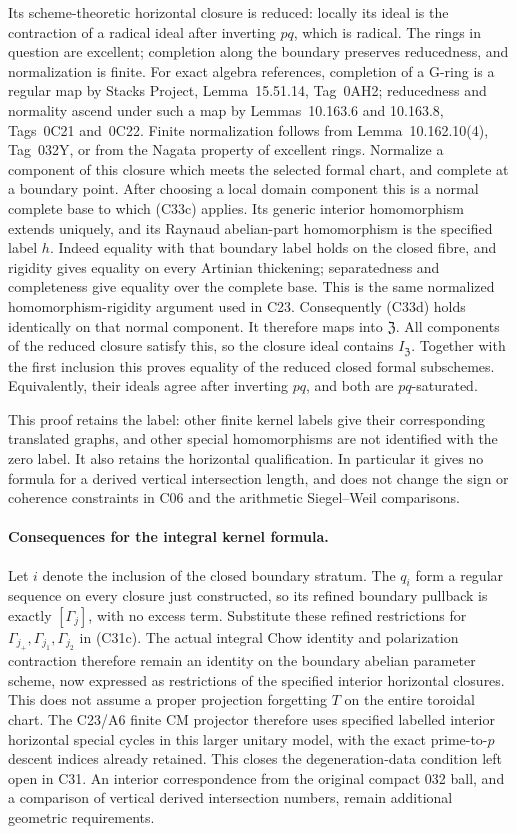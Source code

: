Its scheme-theoretic horizontal closure
is reduced: locally its ideal is the
contraction of a radical ideal after
inverting $pq$, which is radical.
The rings in question are excellent;
completion along the boundary preserves
reducedness, and normalization is finite.
For exact algebra references, completion
of a G-ring is a regular map by Stacks
Project, Lemma~15.51.14, Tag~0AH2;
reducedness and normality ascend under
such a map by Lemmas~10.163.6 and
10.163.8, Tags~0C21 and~0C22.
Finite normalization follows from
Lemma~10.162.10(4), Tag~032Y, or from
the Nagata property of excellent rings.
Normalize a component of this closure
which meets the selected formal chart,
and complete at a boundary point. After
choosing a local domain component this
is a normal complete base to which
(C33c) applies. Its generic interior
homomorphism extends uniquely, and its
Raynaud abelian-part homomorphism is the
specified label $h$. Indeed equality
with that boundary label holds on the
closed fibre, and rigidity gives equality
on every Artinian thickening; separatedness
and completeness give equality over the
complete base. This is the same
normalized homomorphism-rigidity argument
used in C23. Consequently (C33d)
holds identically on that normal component.
It therefore maps into $\mathfrak Z$.
All components of the reduced closure
satisfy this, so the closure ideal contains
$I_{\mathfrak Z}$. Together with the first
inclusion this proves equality of the
reduced closed formal subschemes. Equivalently,
their ideals agree after inverting $pq$,
and both are $pq$-saturated.

This proof retains the label: other finite
kernel labels give their corresponding
translated graphs, and other special
homomorphisms are not identified with the
zero label. It also retains the horizontal
qualification. In particular it gives no
formula for a derived vertical intersection
length, and does not change the sign or
coherence constraints in C06 and the
arithmetic Siegel--Weil comparisons.

\paragraph{Consequences for the integral kernel formula.}
Let $i$ denote the inclusion of the
closed boundary stratum. The $q_i$
form a regular sequence on every
closure just constructed, so its
refined boundary pullback is exactly
$[\Gamma_j]$, with no excess term.
Substitute these refined restrictions
for $\Gamma_{j_+},\Gamma_{j_1},\Gamma_{j_2}$
in (C31c). The actual integral Chow
identity and polarization contraction
therefore remain an identity on the
boundary abelian parameter scheme,
now expressed as restrictions of the
specified interior horizontal closures.
This does not assume a proper projection
forgetting $T$ on the entire toroidal
chart. The C23/A6 finite CM
projector therefore uses specified
labelled interior horizontal special
cycles in this larger unitary model,
with the exact prime-to-$p$ descent
indices already retained. This closes
the degeneration-data condition left
open in C31. An interior correspondence
from the original compact 032 ball,
and a comparison of vertical derived
intersection numbers, remain additional
geometric requirements.

